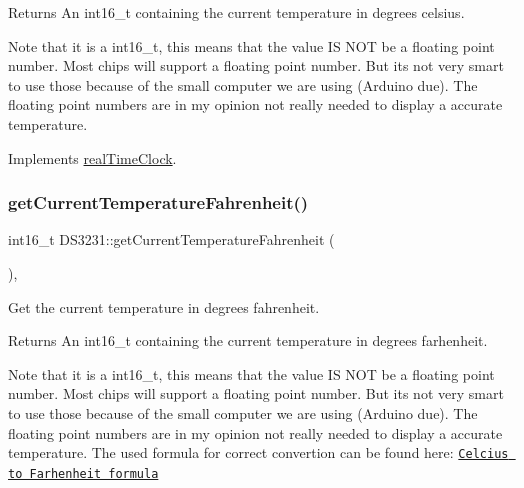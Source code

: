 \begin{DoxyReturn}{Returns}
An int16\+\_\+t containing the current temperature in degrees celsius.
\end{DoxyReturn}
Note that it is a int16\+\_\+t, this means that the value IS N\+OT be a floating point number. Most chips will support a floating point number. But it\textquotesingle{}s not very smart to use those because of the small computer we are using (Arduino due). The floating point numbers are in my opinion not really needed to display a accurate temperature. 

Implements \mbox{\hyperlink{classreal_time_clock_ac662348fcf7b5fb51fdcf79f83958a33}{real\+Time\+Clock}}.

\mbox{\label{class_d_s3231_aa31acb133cc63aa7a2a25eda6244c9df}} 
\subsubsection{\texorpdfstring{get\+Current\+Temperature\+Fahrenheit()}{getCurrentTemperatureFahrenheit()}}
{\footnotesize\ttfamily int16\+\_\+t D\+S3231\+::get\+Current\+Temperature\+Fahrenheit (\begin{DoxyParamCaption}{ }\end{DoxyParamCaption})\hspace{0.3cm}{\ttfamily [override]}, {\ttfamily [virtual]}}



Get the current temperature in degrees fahrenheit. 

\begin{DoxyReturn}{Returns}
An int16\+\_\+t containing the current temperature in degrees farhenheit.
\end{DoxyReturn}
Note that it is a int16\+\_\+t, this means that the value IS N\+OT be a floating point number. Most chips will support a floating point number. But it\textquotesingle{}s not very smart to use those because of the small computer we are using (Arduino due). The floating point numbers are in my opinion not really needed to display a accurate temperature. The used formula for correct convertion can be found here\+: \href{https://www.rapidtables.com/convert/temperature/how-celsius-to-fahrenheit.html}{\tt Celcius to Farhenheit formula} 

